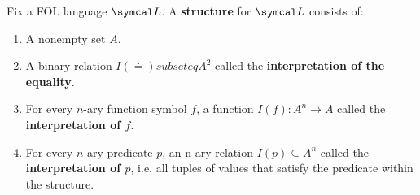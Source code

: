 \begin{definition}\label{def:first_order_structure}\cite[definition 4.1]{Nerode2012}
  Fix a FOL language \( \Cal{L} \). A \textbf{structure} for \( \Cal{L} \) consists of:
  \begin{enumerate}
    \item A nonempty set \( A \).
    \item A binary relation \( I(\doteq) subseteq A^2 \) called the \textbf{interpretation of the equality}.
    \item For every \( n \)-ary function symbol \( f \), a function \( I(f): A^n \to A \) called the \textbf{interpretation of \( f \)}.
    \item For every \( n \)-ary predicate \( p \), an n-ary relation \( I(p) \subseteq A^n \) called the \textbf{interpretation of \( p \)}, i.e. all tuples of values that satisfy the predicate within the structure.
  \end{enumerate}
\end{definition}

